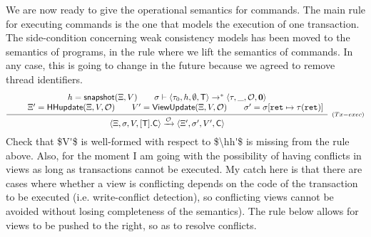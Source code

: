 \documentclass[a4paper,UKenglish]{article}%
\theoremstyle{plain}
\begin{document}
We are now ready to give the operational semantics for commands.
The main rule for executing commands is the one that models the execution of one transaction. 
\ac{The side-condition concerning weak consistency models 
has been moved to the semantics of programs, in the rule where we 
lift the semantics of commands. In any case, this is going to change in the future 
because we agreed to remove thread identifiers.}
\[
\infer[{\scriptstyle(Tx-exec)}]{\langle \hh, \thdstack, V, [\trans].\cmd \rangle \xrightarrow{\mathcal{O}} \langle \hh', \thdstack', V', \cmd \rangle}
{\begin{array}{c}
h = \snapshot(\hh, V) \qquad 
\thdstack \vdash \langle \txstack_{0}, \heap, \emptyset, \trans \rangle \rightarrow^{\ast} \langle \txstack, \_, \mathcal{O}, \nil \rangle 
\\
\qquad
\hh' = \mathsf{HHupdate}(\hh, V, \mathcal{O}) \qquad V' = \mathsf{ViewUpdate}(\hh, V, \mathcal{O}) \qquad 
\thdstack' = \thdstack[\retvar \mapsto \txstack(\retvar)]
\end{array}
}
\]
\ac{Check that $V'$ is well-formed with respect to $\hh'$ is missing from the rule above. 
Also, for the moment I am going with the possibility of having conflicts in views as long as 
transactions cannot be executed. My catch here is that there are cases where whether 
a view is conflicting depends on the code of the transaction to be executed (i.e. write-conflict 
detection), so conflicting views cannot be avoided without losing completeness of the semantics). 
The rule below allows for views to be pushed to the right, so as to resolve conflicts.}
\end{document}
